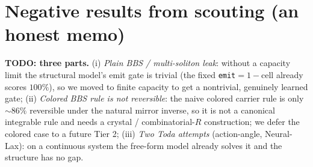 \documentclass[11pt]{article}
\theoremstyle{definition}
\theoremstyle{plain}
\begin{document}
\section{Negative results from scouting (an honest memo)}\label{app:negatives}
\textbf{TODO: three parts.}
(i) \emph{Plain BBS / multi-soliton leak}: without a capacity limit the structural model's emit gate is
trivial (the fixed \texttt{emit}$=1-$cell already scores $100\%$), so we moved to finite capacity to get
a nontrivial, genuinely learned gate;
(ii) \emph{Colored BBS rule is not reversible}: the naive colored carrier rule is only $\sim86\%$
reversible under the natural mirror inverse, so it is not a canonical integrable rule and needs a crystal
/ combinatorial-$R$ construction; we defer the colored case to a future Tier 2;
(iii) \emph{Two Toda attempts} (action-angle, Neural-Lax): on a continuous system the free-form model
already solves it and the structure has no gap.



\end{document}
